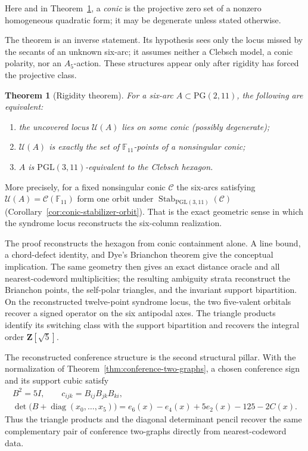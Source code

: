 \documentclass[11pt]{article}
\newtheorem{theorem}{Theorem}[section]
\theoremstyle{definition}
\theoremstyle{remark}
\newcommand{\PG}{\mathrm{PG}}
\newcommand{\F}{\mathbb{F}}
\newcommand{\cC}{\mathcal{C}}
\newcommand{\cU}{\mathcal{U}}
\begin{document}
Here and in Theorem~\ref{thm:rigidity}, a \emph{conic} is the projective
zero set of a nonzero homogeneous quadratic form; it may be degenerate
unless stated otherwise.

The theorem is an inverse statement.  Its hypothesis sees only the locus
missed by the secants of an unknown six-arc; it assumes neither a Clebsch
model, a conic polarity, nor an $A_5$-action.  These structures appear only
after rigidity has forced the projective class.

\begin{theorem}[Rigidity theorem]
\label{thm:rigidity}
For a six-arc $A\subset\PG(2,11)$, the following are equivalent:
\begin{enumerate}[label=(\roman*),leftmargin=2em]
\item the uncovered locus $\cU(A)$ lies on some conic (possibly
degenerate);
\item $\cU(A)$ is exactly the set of $\F_{11}$-points of a nonsingular
conic;
\item $A$ is $\mathrm{PGL}(3,11)$-equivalent to the Clebsch hexagon.
\end{enumerate}
\end{theorem}

More precisely, for a fixed nonsingular conic $\cC$ the six-arcs satisfying
$\cU(A)=\cC(\F_{11})$ form one orbit under
$\operatorname{Stab}_{\mathrm{PGL}(3,11)}(\cC)$
(Corollary~\ref{cor:conic-stabilizer-orbit}).  That is the exact geometric
sense in which the syndrome locus reconstructs the six-column realization.

The proof reconstructs the hexagon from conic containment alone.
A line bound, a chord-defect identity, and Dye's Brianchon theorem give the
conceptual implication.  The same geometry then gives an exact distance
oracle and all nearest-codeword multiplicities; the resulting ambiguity
strata reconstruct the Brianchon points, the self-polar triangles, and the
invariant support bipartition.  On the reconstructed twelve-point syndrome
locus, the two five-valent orbitals recover a signed operator on the six
antipodal axes.  The triangle products identify its switching class with the
support bipartition and recovers the integral order $\mathbf Z[\sqrt5]$.

The reconstructed conference structure is the second structural pillar.
With the normalization of Theorem~\ref{thm:conference-two-graphs}, a chosen
conference sign and its support cubic satisfy
\[
 \begin{gathered}
 B^2=5I,\qquad c_{ijk}=B_{ij}B_{jk}B_{ki},\\
 \det\!\bigl(B+\operatorname{diag}(x_0,\ldots,x_5)\bigr)
 =e_6(x)-e_4(x)+5e_2(x)-125-2C(x).
 \end{gathered}
\]
Thus the triangle products and the diagonal determinant pencil recover the same
complementary pair of conference two-graphs directly from nearest-codeword
data.
\end{document}

